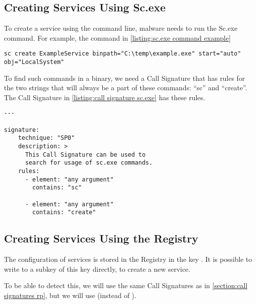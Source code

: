 \subsection{Creating Services Using Sc.exe}\label{section:call signature sc.exe}
To create a service using the command line, malware needs to run the Sc.exe command. For example, the command in \autoref{listing:sc.exe command example}

\begin{lstlisting}[label={listing:sc.exe command example}, caption={An example usage of \texttt{sc.exe}.}, captionpos=b]
sc create ExampleService binpath="C:\temp\example.exe" start="auto" obj="LocalSystem"
\end{lstlisting}

To find such commands in a binary, we need a Call Signature that has rules for the two strings that will always be a part of these commands: ``sc'' and ``create''. The Call Signature in \autoref{listing:call signature sc.exe} has these rules.

\begin{lstlisting}[label={listing:call signature sc.exe}, caption={A Call Signature that matches creating a service using the \texttt{sc.exe} application.}, captionpos=b]
---

signature:
    technique: "SP0"
    description: >
      This Call Signature can be used to
      search for usage of sc.exe commands.
    rules:
      - element: "any argument"
        contains: "sc"

      - element: "any argument"
        contains: "create"
\end{lstlisting}

\subsection{Creating Services Using the Registry}
The configuration of services is stored in the Registry in the key . It is possible to write to a subkey of this key directly, to create a new service.

To be able to detect this, we will use the same Call Signatures as in \autoref{section:call signatures rp}, but we will use  (instead of ).
